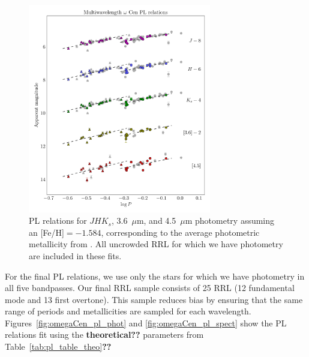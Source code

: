 \documentclass[a4paper,fleqn,usenatbib]{mnras}
\begin{document}
\begin{figure}
\begin{center}
\includegraphics[width=80mm]{final_plots/multiwavelength_PL_allstars.pdf}
\caption{PL relations for $J\!H\!K_s$, 3.6~$\mu$m, and 4.5~$\mu$m photometry assuming an [Fe/H]$=-1.584$, corresponding to the average photometric metallicity from \citet{2000AJ....119.1824R}. All uncrowded RRL for which we have photometry are included in these fits.}
\label{fig:omegaCen_pl_allstars}
\end{center}
\end{figure}


For the final PL relations, we use only the stars for which we have photometry in all five bandpasses. Our final RRL sample consists of 25 RRL (12 fundamental mode and 13 first overtone). This sample reduces bias by ensuring that the same range of periods and metallicities are sampled for each wavelength. Figures~\ref{fig:omegaCen_pl_phot} and \ref{fig:omegaCen_pl_spect} show the PL relations fit using the {\bf theoretical??} parameters from Table~\ref{tab:pl_table_theo}{\bf??}

\end{document}
